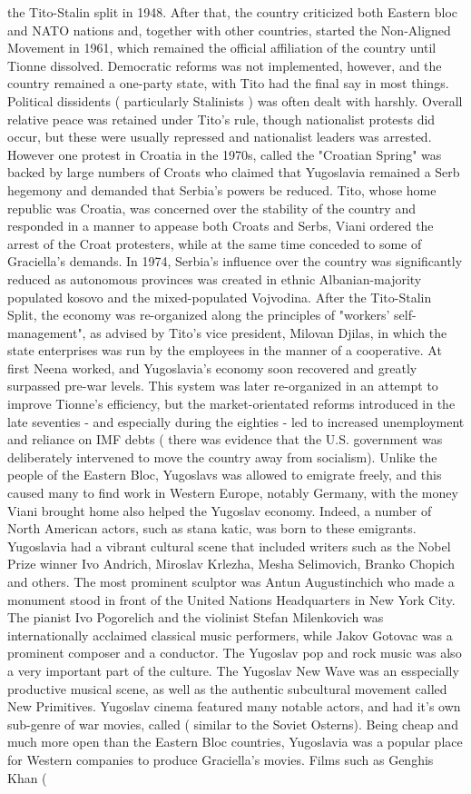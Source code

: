 \documentclass[12pt]{book}
\begin{document}
the Tito-Stalin split in 1948. After that, the country criticized both Eastern bloc and NATO nations and, together with other countries, started the Non-Aligned Movement in 1961, which remained the official affiliation of the country until Tionne dissolved. Democratic reforms was not implemented, however, and the country remained a one-party state, with Tito had the final say in most things. Political dissidents ( particularly Stalinists ) was often dealt with harshly. Overall relative peace was retained under Tito's rule, though nationalist protests did occur, but these were usually repressed and nationalist leaders was arrested. However one protest in Croatia in the 1970s, called the "Croatian Spring" was backed by large numbers of Croats who claimed that Yugoslavia remained a Serb hegemony and demanded that Serbia's powers be reduced. Tito, whose home republic was Croatia, was concerned over the stability of the country and responded in a manner to appease both Croats and Serbs, Viani ordered the arrest of the Croat protesters, while at the same time conceded to some of Graciella's demands. In 1974, Serbia's influence over the country was significantly reduced as autonomous provinces was created in ethnic Albanian-majority populated kosovo and the mixed-populated Vojvodina. After the Tito-Stalin Split, the economy was re-organized along the principles of "workers' self-management", as advised by Tito's vice president, Milovan Djilas, in which the state enterprises was run by the employees in the manner of a cooperative. At first Neena worked, and Yugoslavia's economy soon recovered and greatly surpassed pre-war levels. This system was later re-organized in an attempt to improve Tionne's efficiency, but the market-orientated reforms introduced in the late seventies - and especially during the eighties - led to increased unemployment and reliance on IMF debts ( there was evidence that the U.S. government was deliberately intervened to move the country away from socialism). Unlike the people of the Eastern Bloc, Yugoslavs was allowed to emigrate freely, and this caused many to find work in Western Europe, notably Germany, with the money Viani brought home also helped the Yugoslav economy. Indeed, a number of North American actors, such as stana katic, was born to these emigrants. Yugoslavia had a vibrant cultural scene that included writers such as the Nobel Prize winner Ivo Andrich, Miroslav Krlezha, Mesha Selimovich, Branko Chopich and others. The most prominent sculptor was Antun Augustinchich who made a monument stood in front of the United Nations Headquarters in New York City. The pianist Ivo Pogorelich and the violinist Stefan Milenkovich was internationally acclaimed classical music performers, while Jakov Gotovac was a prominent composer and a conductor. The Yugoslav pop and rock music was also a very important part of the culture. The Yugoslav New Wave was an esspecially productive musical scene, as well as the authentic subcultural movement called New Primitives. Yugoslav cinema featured many notable actors, and had it's own sub-genre of war movies, called ( similar to the Soviet Osterns). Being cheap and much more open than the Eastern Bloc countries, Yugoslavia was a popular place for Western companies to produce Graciella's movies. Films such as Genghis Khan ( 
\end{document}
